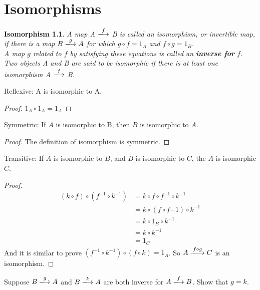 \documentclass{book}
\begin{document}
\chapter{Isomorphisms}

\newtheorem{isomorphism}{Isomorphism}

\begin{isomorphism}
  A map A $\xlongrightarrow{f}$ B is called an isomorphism, or invertible
  map, if there is a map $ B \xlongrightarrow{g} A$ for which $g \circ f
  = 1_{A}$ and $f \circ g = 1_{B}$.\\
  A map $g$ related to $f$ by satisfying these equations is called an
  \textbf{inverse for} $f$.\\
  Two objects A and B are said to be isomorphic if there is at least one
  isomorphism A $\xlongrightarrow{f}$ B.
\end{isomorphism}

Reflexive: A is isomorphic to A.

\begin{proof}
  $1_{A} \circ 1_{A} = 1_{A}$
\end{proof}

Symmetric: If $A$ is isomorphic to B, then $B$ is isomorphic to $A$.
\begin{proof}
  The definition of isomorphism is symmetric.
\end{proof}

Transitive: If $A$ is isomorphic to $B$, and $B$ is isomorphic to $C$, the $A$
is isomorphic $C$.
\begin{proof}
  \begin{align*}
    (k \circ f) \circ (f^{-1} \circ k^{-1}) & = k \circ f \circ f^{-1} \circ
    k^{-1} \\
                                            & = k \circ (f \circ f{-1}) \circ
                                            k^{-1} \\
                                            & = k \circ 1_{B} \circ k^{-1} \\
                                            & = k \circ k^{-1} \\
                                            & = 1_{C}
  \end{align*}
  And it is similar to prove $(f^{-1} \circ k^{-1}) \circ (f \circ k) = 1_{A}$.
  So $A \xlongrightarrow{f \circ g} C$ is an isomorphism.

\end{proof}

Suppose $B \xlongrightarrow{g} A$ and $B \xlongrightarrow{k} A$ are both inverse
for $A \xlongrightarrow{f} B$. Show that $g = k$.
\end{document}
